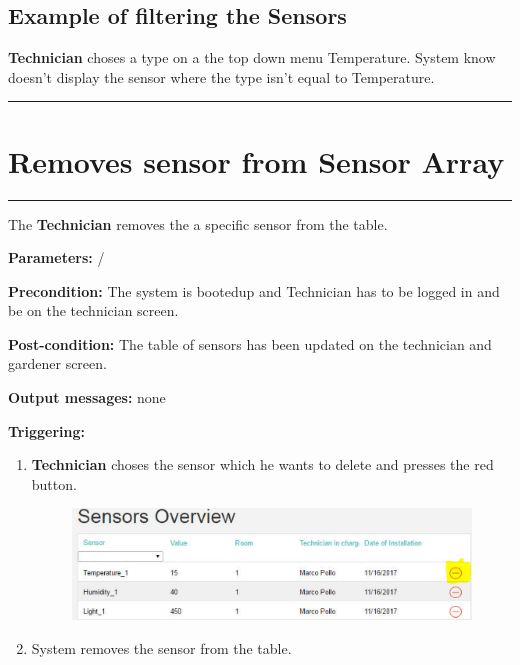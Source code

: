 \subsection{Example of filtering the Sensors}
\textbf{Technician} choses a type on a the top down menu Temperature. System
know doesn't display the sensor where the type isn't equal to Temperature.
\hfill
\vspace{0.5cm}
\hrule






\section{Removes sensor from Sensor Array}

\hrule
\hfill
\vspace{0.5cm}

\label{operation:removesSensor}

The \textbf{Technician} removes the a specific sensor from the table.
\begin{description}

\item \textbf{Parameters:} /
\item \textbf{Precondition:} The system is bootedup and Technician has to be
logged in and be on the technician screen.
\item \textbf{Post-condition:} The table of sensors has been updated on the
technician and gardener screen.
\item \textbf{Output messages:} none
\item \textbf{Triggering:}
\begin{enumerate}
\item \textbf{Technician} choses the sensor which he wants to delete and presses
the red button.
\begin{figure}[H]
\includegraphics[width=1\textwidth]{images/RemoveSensorFromSensorListTechnician.eps}
\end{figure}
\item System removes the sensor from the table.
\end{enumerate}
\end{description}

